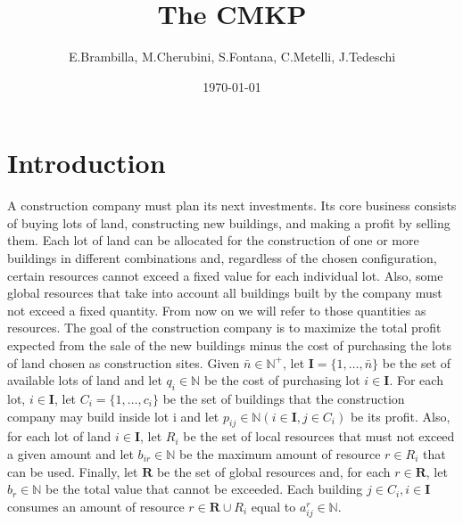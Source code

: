 \documentclass[a4paper, twocolumn, oneside, 10pt]{article}
\title{The \ac{CMKP}}
\author{E.Brambilla, M.Cherubini, S.Fontana, C.Metelli, J.Tedeschi}
\date{\today}
\begin{document}

\section{Introduction}\label{sec:problem}
A construction company must plan its next investments. Its core business consists of buying lots of land, constructing new buildings, and making a profit by selling them. 
Each lot of land can be allocated for the construction of one or more buildings in different combinations and, regardless of the chosen configuration, certain resources cannot exceed a fixed value for each individual lot. 
Also, some global resources that take into account all buildings built by the company must not exceed a fixed quantity. From now on we will refer to those quantities
as resources. 
The goal of the construction company is to maximize the total profit expected from the sale of
the new buildings minus the cost of purchasing the lots of land chosen as construction sites.
Given \(\bar{n} \in \mathbb{N}^+\), let \(\mathbf{I} = \{ 1, \ldots , \bar{n} \}\) be the set of available lots of land and let \(q_i \in \mathbb{N}\)  be the cost of purchasing lot \( i \in \mathbf{I}\). 
For each lot, \(i \in \mathbf{I}\), let \(C_i = \{ 1, \ldots , c_i \}\) be the set of buildings that the construction company may build inside lot i and let \(p_{ij} \in \mathbb{N} (i \in \mathbf{I}, j \in C_i)\) be its profit. 
Also, for each lot of land \(i \in \mathbf{I}\), let \(R_i\) be the set of local resources that must not exceed a given amount and let \(b_{ir} \in \mathbb{N}\) be the maximum amount of resource \(r \in R_i\) that can be used. Finally, let \(\mathbf{R}\) be the set of global resources and, for each \(r \in \mathbf{R} \), let \(b_r \in \mathbb{N} \) be the total value that cannot be exceeded. 
Each building \(j \in C_i, i \in \mathbf{I}\) consumes an amount of resource \(r \in \mathbf{R} \cup R_i\) equal to \(a^r_{ij} \in \mathbb{N}\).
\end{document}
